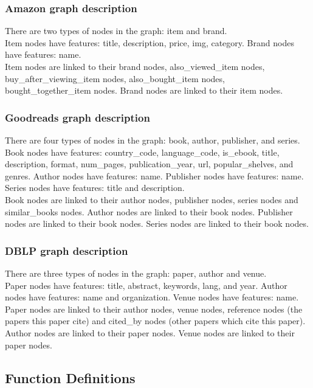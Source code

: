 \subsubsection{Amazon graph description}
There are two types of nodes in the graph: item and brand.\\
Item nodes have features: title, description, price, img, category. Brand nodes have features: name.\\
Item nodes are linked to their brand nodes, also\_viewed\_item nodes, buy\_after\_viewing\_item nodes, also\_bought\_item nodes, bought\_together\_item nodes. Brand nodes are linked to their item nodes.

\subsubsection{Goodreads graph description}
There are four types of nodes in the graph: book, author, publisher, and series.\\
Book nodes have features: country\_code, language\_code, is\_ebook, title, description, format, num\_pages, publication\_year, url, popular\_shelves, and genres. Author nodes have features: name. Publisher nodes have features: name. Series nodes have features: title and description.\\
Book nodes are linked to their author nodes, publisher nodes, series nodes and similar\_books nodes. Author nodes are linked to their book nodes. Publisher nodes are linked to their book nodes. Series nodes are linked to their book nodes.

\subsubsection{DBLP graph description}
There are three types of nodes in the graph: paper, author and venue.\\
Paper nodes have features: title, abstract, keywords, lang, and year. Author nodes have features: name and organization. Venue nodes have features: name.\\
Paper nodes are linked to their author nodes, venue nodes, reference nodes (the papers this paper cite) and cited\_by nodes (other papers which cite this paper). Author nodes are linked to their paper nodes. Venue nodes are linked to their paper nodes.

\subsection{Function Definitions}

